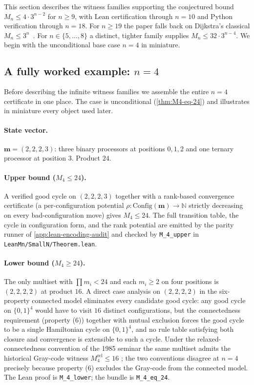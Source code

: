 \documentclass[11pt,a4paper]{article}
\theoremstyle{plain}
\theoremstyle{definition}
\newcommand{\Mn}{M_n}
\newcommand{\Config}{\mathrm{Config}}
\begin{document}
This section describes the witness families supporting the conjectured
bound $\Mn \le 4 \cdot 3^{n-2}$ for $n \ge 9$, with Lean certification
through $n = 10$ and Python verification through $n = 18$.  For
$n \ge 19$ the paper falls back on Dijkstra's classical
$\Mn \le 3^n$~\cite{Dijkstra1974}.  For $n \in \{5, \ldots, 8\}$ a
distinct, tighter family supplies $\Mn \le 32 \cdot 3^{n-4}$.  We
begin with the unconditional base case $n = 4$ in miniature.

\subsection{A fully worked example: $n = 4$}\label{sec:upper-n4}

Before describing the infinite witness families we assemble the
entire $n = 4$ certificate in one place.  The case is unconditional
(\cref{thm:M4-eq-24}) and illustrates in miniature every object
used later.

\paragraph{State vector.} $\mathbf{m} = (2, 2, 2, 3)$: three binary
processors at positions $0, 1, 2$ and one ternary processor at
position $3$.  Product $24$.

\paragraph{Upper bound ($M_4 \le 24$).} A verified good cycle on
$(2, 2, 2, 3)$ together with a rank-based convergence certificate
(a per-configuration potential $\rho : \Config(\mathbf{m}) \to
\mathbb{N}$ strictly decreasing on every bad-configuration move)
gives $M_4 \le 24$.  The full transition table, the cycle in
configuration form, and the rank potential are emitted by the
parity runner of \cref{app:lean-encoding-audit} and checked by
\texttt{M\_4\_upper} in \texttt{LeanMn/SmallN/Theorem.lean}.

\paragraph{Lower bound ($M_4 \ge 24$).} The only multiset with
$\prod m_i < 24$ and each $m_i \ge 2$ on four positions is
$(2, 2, 2, 2)$ at product $16$.  A direct case analysis on
$(2, 2, 2, 2)$ in the six-property connected model eliminates every
candidate good cycle: any good cycle on $\{0, 1\}^4$ would have to
visit $16$ distinct configurations, but the connectedness
requirement (property (6)) together with mutual exclusion forces
the good cycle to be a single Hamiltonian cycle on $\{0,1\}^4$, and
no rule table satisfying both closure and convergence is
extensible to such a cycle.  Under the relaxed-connectedness
convention of the 1985 seminar the same multiset admits the
historical Gray-code witness $M_4^{\mathrm{rel}} \le 16$
\cite[p.~70]{HaddadKnuth1985}; the two conventions disagree at
$n = 4$ precisely because property (6) excludes the Gray-code from
the connected model.  The Lean proof is \texttt{M\_4\_lower}; the
bundle is \texttt{M\_4\_eq\_24}.
\end{document}
